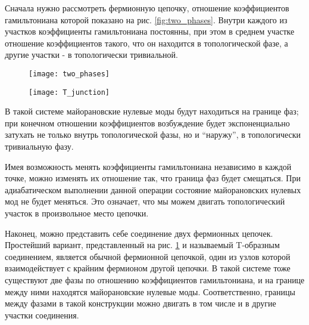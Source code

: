 \documentclass[a4paper,12pt]{article}
\theoremstyle{plain} %
\theoremstyle{definition} %
\theoremstyle{remark} %
\begin{document}
Сначала нужно рассмотреть фермионную цепочку, отношение коэффициентов гамильтониана которой показано на рис. \ref{fig:two_phases}. Внутри каждого из участков коэффициенты гамильтониана постоянны, при этом в среднем участке отношение коэффициентов такого, что он находится в топологической фазе, а другие участки - в топологически тривиальной.

\begin{figure}
    \centering
    \begin{minipage}{.5\textwidth}
        \centering
        \texttt{[image: two\_phases]}
        \captionsetup{width=0.9\textwidth}
        \label{fig:two_phases}
    \end{minipage}%
    \begin{minipage}{.5\textwidth}
        \centering
        \texttt{[image: T\_junction]}
        \captionsetup{width=0.9\textwidth}
        \label{fig:t_junction}
    \end{minipage}
\end{figure}

В такой системе майорановские нулевые моды будут находиться на границе фаз; при конечном отношении коэффициентов возбуждение будет экспоненциально затухать не только внутрь топологической фазы, но и ``наружу'', в топологически тривиальную фазу.

Имея возможность менять коэффициенты гамильтониана независимо в каждой точке, можно изменять их отношение так, что граница фаз будет смещаться. При адиабатическом выполнении данной операции состояние майорановских нулевых мод не будет меняться. Это означает, что мы можем двигать топологический участок в произвольное место цепочки.

Наконец, можно представить себе соединение двух фермионных цепочек. Простейший вариант, представленный на рис. \ref{fig:t_junction} и называемый T-\hspace{0pt}образным соединением, является обычной фермионной цепочкой, один из узлов которой взаимодействует с крайним фермионом другой цепочки. В такой системе тоже существуют две фазы по отношению коэффициентов гамильтониана, и на границе между ними находятся майорановские нулевые моды. Соответственно, границы между фазами в такой конструкции можно двигать в том числе и в другие участки соединения.
\end{document}

